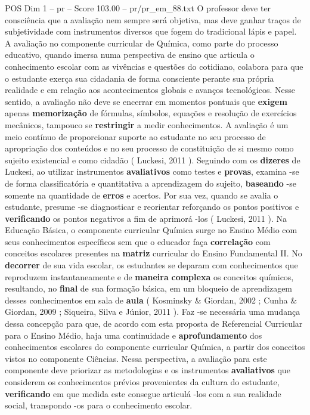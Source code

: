 \begin{textsample}{POS Dim 1 – pr – Score 103.00 – pr/pr\_em\_88.txt}
O professor deve ter consciência que a avaliação nem sempre será objetiva, mas deve ganhar traços de subjetividade com instrumentos diversos que fogem do tradicional lápis e papel.
A avaliação no componente curricular de Química, como parte do processo educativo, quando imersa numa perspectiva de ensino que articula o conhecimento escolar com as vivências e questões do cotidiano, colabora para que o estudante exerça sua cidadania de forma consciente perante sua própria realidade e em relação aos acontecimentos globais e avanços tecnológicos.
Nesse sentido, a avaliação não deve se encerrar em momentos pontuais que \textbf{exigem} apenas \textbf{memorização} de fórmulas, símbolos, equações e resolução de exercícios mecânicos, tampouco se \textbf{restringir} a medir conhecimentos.
A avaliação é um meio contínuo de proporcionar suporte ao estudante no seu processo de apropriação dos conteúdos e no seu processo de constituição de si mesmo como sujeito existencial e como cidadão ( Luckesi, 2011 ).
Seguindo com os \textbf{dizeres} de Luckesi, ao utilizar instrumentos \textbf{avaliativos} como testes e \textbf{provas}, examina -se de forma classificatória e quantitativa a aprendizagem do sujeito, \textbf{baseando} -se somente na quantidade de \textbf{erros} e acertos.
Por sua vez, quando se avalia o estudante, presume -se diagnosticar e reorientar reforçando os pontos positivos e \textbf{verificando} os pontos negativos a fim de aprimorá -los ( Luckesi, 2011 ).
Na Educação Básica, o componente curricular Química surge no Ensino Médio com seus conhecimentos específicos sem que o educador faça \textbf{correlação} com conceitos escolares presentes na \textbf{matriz} curricular do Ensino Fundamental II.
No \textbf{decorrer} de sua vida escolar, os estudantes se deparam com conhecimentos que reproduzem instantaneamente e de \textbf{maneira} \textbf{complexa} os conceitos químicos, resultando, no \textbf{final} de sua formação básica, em um bloqueio de aprendizagem desses conhecimentos em sala de \textbf{aula} ( Kosminsky \& Giordan, 2002 ; Cunha \& Giordan, 2009 ; Siqueira, Silva e Júnior, 2011 ).
Faz -se necessária uma mudança dessa concepção para que, de acordo com esta proposta de Referencial Curricular para o Ensino Médio, haja uma continuidade e \textbf{aprofundamento} dos conhecimentos escolares do componente curricular Química, a partir dos conceitos vistos no componente Ciências.
Nessa perspectiva, a avaliação para este componente deve priorizar as metodologias e os instrumentos \textbf{avaliativos} que considerem os conhecimentos prévios provenientes da cultura do estudante, \textbf{verificando} em que medida este consegue articulá -los com a sua realidade social, transpondo -os para o conhecimento escolar.

\end{textsample}
